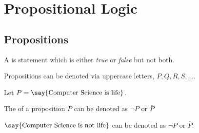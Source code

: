 \section{Propositional Logic} \label{sec:propositionanl_logic}

\subsection{Propositions}

\begin{definition} \label{def:proposition}
    A  is statement which is either \textit{true} or \textit{false} but not both.
\end{definition}

Propositions can be denoted via uppercase letters, $P, Q, R, S, \dots$.

\begin{example} \label{ex:proposition}
    Let $P = \text{\say{Computer Science is life}}$.
\end{example}

\begin{definition} \label{def:negation}
    The  of a proposition $P$ can be denoted as $\lnot P$ or $\bar{P}$
\end{definition}

\begin{example}
    $\text{\say{Computer Science is not life}}$ can be denoted as $\lnot P$ or $\overline{P}$.
\end{example}

